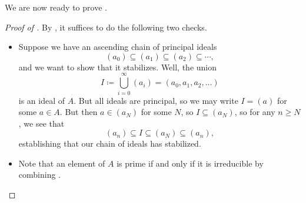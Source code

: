 \documentclass[../notes.tex]{subfiles}
\begin{document}
We are now ready to prove .
\begin{proof}[Proof of ]
	By , it suffices to do the following two checks.
	\begin{itemize}
		\item Suppose we have an ascending chain of principal ideals
		\[(a_0)\subseteq(a_1)\subseteq(a_2)\subseteq\cdots,\]
		and we want to show that it stabilizes. Well, the union
		\[I\coloneqq\bigcup_{i=0}^\infty(a_i)=(a_0,a_1,a_2,\ldots)\]
		is an ideal of $A$. But all ideals are principal, so we may write $I=(a)$ for some $a\in A$. But then $a\in(a_N)$ for some $N$, so $I\subseteq(a_N)$, so for any $n\ge N$, we see that
		\[(a_n)\subseteq I\subseteq(a_N)\subseteq(a_n),\]
		establishing that our chain of ideals has stabilized.

		\item Note that an element of $A$ is prime if and only if it is irreducible by combining .
		\qedhere
	\end{itemize}
\end{proof}
\end{document}
